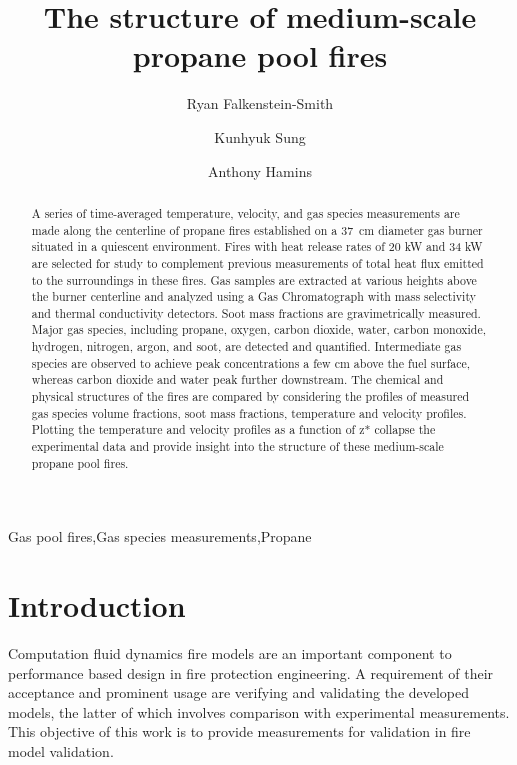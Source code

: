 \documentclass[12pt]{ussci}
\title{The structure of medium-scale propane pool fires}
\author[*1]{Ryan Falkenstein-Smith}
\author{Kunhyuk Sung}
\author{Anthony Hamins}
\affil[1]{National Institute of Standards and Technology, Gaithersburg, MD, USA}
\affil[*]{Corresponding author: \email{ryan.falkenstein-smith@nist.gov}}
\begin{document}
\maketitle

\begin{abstract} %
A series of time-averaged temperature, velocity, and gas species measurements are made along the centerline of propane fires established on a 37~cm diameter gas burner situated in a quiescent environment.  Fires with heat release rates of 20 kW and 34 kW are selected for study to complement previous measurements of total heat flux emitted to the surroundings in these fires. Gas samples are extracted at various heights above the burner centerline and analyzed using a Gas Chromatograph with mass selectivity and thermal conductivity detectors. Soot mass fractions are gravimetrically measured. Major gas species, including propane, oxygen, carbon dioxide, water, carbon monoxide, hydrogen, nitrogen, argon, and soot, are detected and quantified. Intermediate gas species are observed to achieve peak concentrations a few cm above the fuel surface, whereas carbon dioxide and water peak further downstream. The chemical and physical structures of the fires are compared by considering the profiles of measured gas species volume fractions, soot mass fractions, temperature and velocity profiles.  Plotting the temperature and velocity profiles as a function of z* collapse the experimental data and provide insight into the structure of these medium-scale propane pool fires.
\end{abstract}

\begin{keyword}
 Gas pool fires\sep Gas species measurements\sep Propane
\end{keyword}

\section{Introduction}
%
Computation fluid dynamics fire models are an important component to performance based design in fire protection engineering. A requirement of their acceptance and prominent usage are verifying and validating the developed models, the latter of which involves comparison with experimental measurements. This objective of this work is to provide measurements for validation in fire model validation. 
\end{document}
